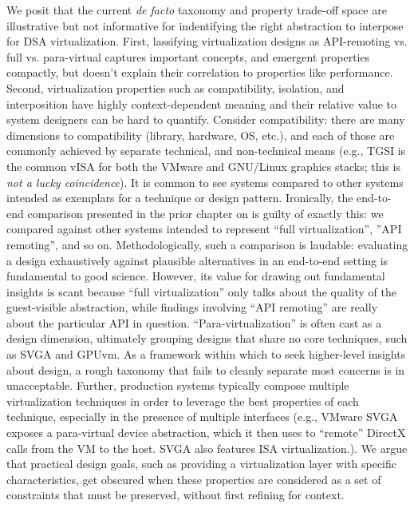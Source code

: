 We posit that the current \emph{de facto} taxonomy and property trade-off
space are illustrative but not informative for indentifying the right
abstraction to interpose for DSA virtualization. First, lassifying
virtualization designs as API-remoting vs. full vs. para-virtual captures
important concepts, and emergent properties compactly, but doesn't explain
their correlation to properties like performance. Second, virtualization
properties such as compatibility, isolation, and interposition have highly
context-dependent meaning and their relative value to system designers can be
hard to quantify. Consider compatibility: there are many dimensions to
compatibility (library, hardware, OS, etc.), and each of those are commonly
achieved by separate technical, and non-technical means (e.g., TGSI is the
common vISA for both the VMware and GNU/Linux graphics stacks; this is \emph{
not a lucky coincidence}). It is common to see systems compared to other
systems intended as exemplars for a technique or design pattern. Ironically,
the end-to-end comparison presented in the prior chapter on \Trillium is
guilty of exactly this: we compared \Trillium against other systems intended
to represent ``full virtualization'', ''API remoting'', and so on.
Methodologically, such a comparison is laudable: evaluating a design
exhaustively against plausible alternatives in an end-to-end setting is
fundamental to good science. However, its value for drawing out fundamental
insights is scant because ``full virtualization'' only talks about the quality
of the guest-visible abstraction, while findings involving ``API remoting''
are really about the particular API in question. ``Para-virtualization'' is
often cast as a design dimension, ultimately grouping designs that share no
core techniques, such as SVGA and GPUvm. As a framework within which to seek
higher-level insights about design, a rough taxonomy that fails to cleanly
separate most concerns is in unacceptable. Further, production systems
typically compose multiple virtualization techniques in order to leverage the
best properties of each technique, especially in the presence of multiple
interfaces (e.g., VMware SVGA~\cite{dowty2009gpu} exposes a para-virtual
device abstraction, which it then uses to ``remote'' DirectX calls from the VM
to the host. SVGA also features ISA virtualization.). We argue that practical
design goals, such as providing a virtualization layer with specific
characteristics, get obscured when these properties are considered as a set of
constraints that must be preserved, without first refining for context.


